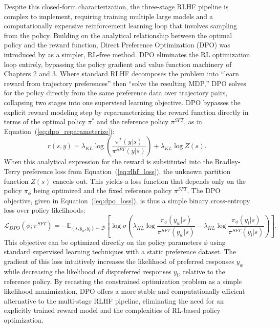 Despite this closed-form characterization, the three-stage RLHF pipeline is complex to implement, requiring training multiple large models and a computationally expensive reinforcement learning loop that involves sampling from the policy. Building on the analytical relationship between the optimal policy and the reward function, Direct Preference Optimization (DPO) was introduced by \citet{rafailov2023direct} as a simpler, RL-free method. DPO eliminates the RL optimization loop entirely, bypassing the policy gradient and value function machinery of Chapters 2 and 3. Where standard RLHF decomposes the problem into ``learn reward from trajectory preferences'' then ``solve the resulting MDP,'' DPO solves for the policy directly from the same preference data over trajectory pairs, collapsing two stages into one supervised learning objective. DPO bypasses the explicit reward modeling step by reparameterizing the reward function directly in terms of the optimal policy $\pi^*$ and the reference policy $\pi^{SFT}$, as in Equation~(\ref{eq:dpo_reparameterize}):
\begin{equation}
    r(s,y) = \lambda_{KL} \log\left(\frac{\pi^*(y|s)}{\pi^{SFT}(y|s)}\right) + \lambda_{KL} \log Z(s).
\label{eq:dpo_reparameterize}
\end{equation}
When this analytical expression for the reward is substituted into the Bradley-Terry preference loss from Equation~(\ref{eq:rlhf_loss}), the unknown partition function $Z(s)$ cancels out. This yields a loss function that depends only on the policy $\pi_\phi$ being optimized and the fixed reference policy $\pi^{SFT}$. The DPO objective, given in Equation~(\ref{eq:dpo_loss}), is thus a simple binary cross-entropy loss over policy likelihoods:
\begin{equation}
    \mathcal{L}_{DPO}(\phi; \pi^{SFT}) = -\mathbb{E}_{(s, y_w, y_l) \sim \mathcal{D}} \left[ \log \sigma \left( \lambda_{KL} \log \frac{\pi_\phi(y_w|s)}{\pi^{SFT}(y_w|s)} - \lambda_{KL} \log \frac{\pi_\phi(y_l|s)}{\pi^{SFT}(y_l|s)} \right) \right].
\label{eq:dpo_loss}
\end{equation}
This objective can be optimized directly on the policy parameters $\phi$ using standard supervised learning techniques with a static preference dataset. The gradient of this loss intuitively increases the likelihood of preferred responses $y_w$ while decreasing the likelihood of dispreferred responses $y_l$, relative to the reference policy. By recasting the constrained optimization problem as a simple likelihood maximization, DPO offers a more stable and computationally efficient alternative to the multi-stage RLHF pipeline, eliminating the need for an explicitly trained reward model and the complexities of RL-based policy optimization.

